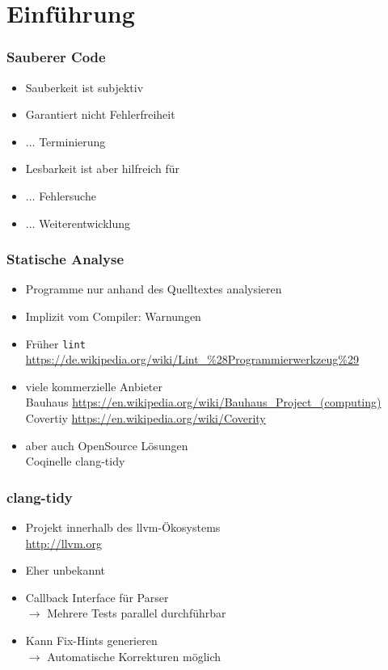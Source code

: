 \documentclass[aspectratio=169]{beamer}
\begin{document}
\section{Einführung}
\begin{frame}
  \frametitle{Sauberer Code}
  \begin{itemize}
  \item Sauberkeit ist subjektiv
    \pause %
  \item Garantiert nicht Fehlerfreiheit
    \pause
  \item $\ldots$ Terminierung
    \pause
  \item Lesbarkeit ist aber hilfreich für
  \item $\ldots$ Fehlersuche
    \pause
  \item $\ldots$ Weiterentwicklung
    \pause
  \end{itemize}
\end{frame}
\begin{frame}
  \frametitle{Statische Analyse}
  \begin{itemize}
  \item Programme nur anhand des Quelltextes analysieren
    \pause
  \item Implizit vom Compiler: Warnungen
    \pause %
  \item Früher \texttt{lint} \\
    \qquad \url{https://de.wikipedia.org/wiki/Lint_\%28Programmierwerkzeug\%29}
    \pause
  \item viele kommerzielle Anbieter\\
    \qquad Bauhaus \url{https://en.wikipedia.org/wiki/Bauhaus_Project_(computing)}\\
    \pause
    \qquad Covertiy \url{https://en.wikipedia.org/wiki/Coverity}\\
    \pause
  \item aber auch OpenSource Lösungen\\
    \qquad Coqinelle
    \pause
    \qquad clang-tidy
    \pause
  \end{itemize}
\end{frame}
\begin{frame}
  \frametitle{clang-tidy}
  \begin{itemize}
  \item Projekt innerhalb des llvm-Ökosystems\\
    \qquad \url{http://llvm.org}
    \pause
  \item Eher unbekannt
    \pause
  \item Callback Interface für Parser
    \pause \\
    \qquad $\rightarrow$ Mehrere Tests parallel durchführbar
    \pause
  \item Kann Fix-Hints generieren 
    \pause \\
  \qquad $\rightarrow$ Automatische Korrekturen möglich    
  \end{itemize}
\end{frame}
\end{document}
